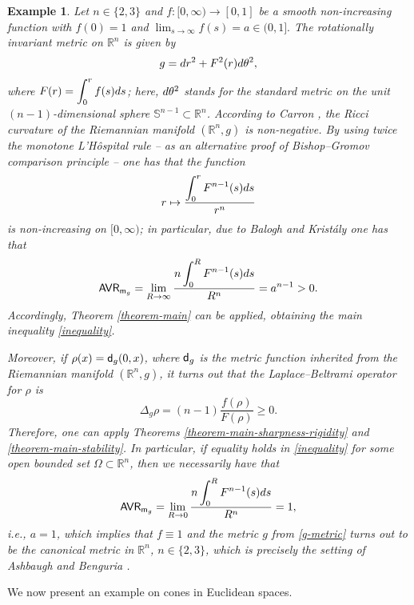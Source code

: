 \documentclass[11pt, reqno]{amsart}
\newcommand{\ds}{\displaystyle}
\newtheorem{example}{ Example}[section]
\numberwithin{equation}{section}
\begin{document}
	\begin{example}\rm Let $n\in \{2,3\}$ and $f:[0,\infty)\to [0,1]$ be a smooth non-increasing function with $f(0)=1$ and $\lim_{s\to  \infty}f(s)=a\in (0,1].$ The rotationally invariant metric on $\mathbb R^n$ is given by 
		\begin{equation}\label{g-metric}
					g={\rm d}r^2+F^2(r){\rm d}\theta^2,
		\end{equation}
	where $F(r)=\ds\int_0^r f(s){\rm d}s$; here, ${\rm d}\theta^2$ stands for the standard metric on the unit $(n-1)$-dimensional sphere $\mathbb S^{n-1}\subset \mathbb R^n$. According to Carron \cite{Carron}, the Ricci curvature of the Riemannian manifold $(\mathbb R^n,g)$ is non-negative. By using twice the monotone L'H\^ospital rule -- as an alternative proof of Bishop--Gromov comparison principle -- one has that the function 
	$$r\mapsto \frac{\ds\int_0^r F^{n-1}(s){\rm d}s}{r^n}$$ is non-increasing on $[0,\infty)$; in particular, due to Balogh and Krist\'aly \cite{BK} one has that 
	$${\sf AVR}_{{\sf m}_g}=\lim_{R\to \infty}\frac{n\ds\int_0^R F^{n-1}(s){\rm d}s}{R^n}=a^{n-1}>0.$$ Accordingly, Theorem \ref{theorem-main} can be applied, obtaining the main inequality  \eqref{inequality}. 
	
	Moreover, if $\rho(x)={\sf d}_g(0,x)$, where ${\sf d}_g$ is the metric function inherited from the Riemannian manifold $(\mathbb R^n,g)$, it turns out that the Laplace--Beltrami operator for $\rho$ is 
	$$\Delta_g \rho=(n-1)\frac{f(\rho)}{F(\rho)}\geq 0.$$
	Therefore, one can apply  Theorems \ref{theorem-main-sharpness-rigidity} and \ref{theorem-main-stability}. 
	In particular, if equality holds in  \eqref{inequality} for some open bounded set $\Omega\subset \mathbb R^n$,   then we necessarily have that
	$${\sf AVR}_{{\sf m}_g}=\lim_{R\to 0}\frac{n\ds\int_0^R F^{n-1}(s){\rm d}s}{R^n}=1,$$
	i.e.,   $a=1$, which implies that $f\equiv 1$ and the metric $g$ from \eqref{g-metric} turns out to be the canonical metric in $\mathbb R^n$, $n\in \{2,3\}$, which is precisely the setting of Ashbaugh and  Benguria \cite{A-B-Duke}.  
	\end{example}
	
	We now present an example on cones in Euclidean spaces. 
	
\end{document}
